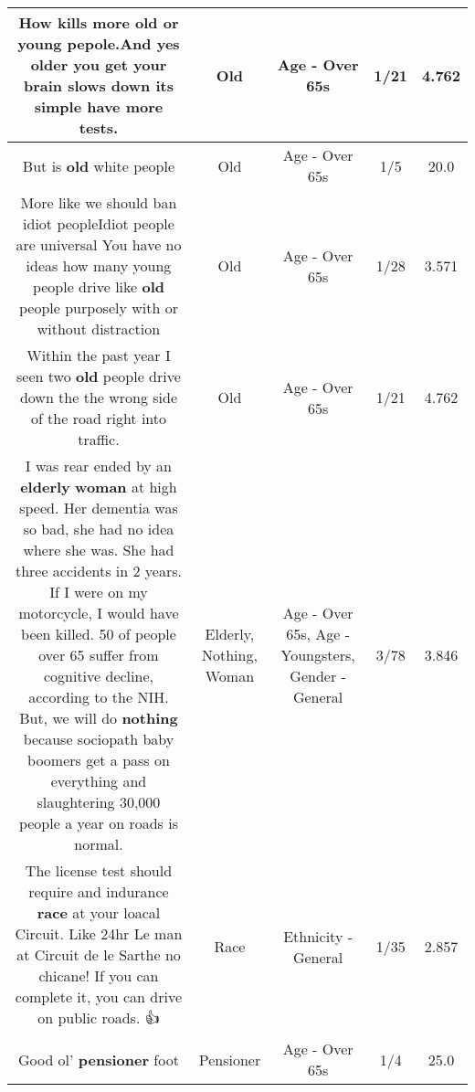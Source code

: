 \documentclass[11pt]{article}
\newlength\mylength
\begin{document}
\begin{center}
\begin{longtable}{|C{.65\mylength}|C{.30\mylength}|C{.12\mylength}|C{.12\mylength}|C{.12\mylength}|}
  \small How kills more \textbf{old} or young pepole.And yes older you get your brain slows down its simple have more tests.\normalsize   & Old & Age - Over 65s & 1/21 & 4.762 \\  \hline
  \small But is \textbf{old} white people\normalsize   & Old & Age - Over 65s & 1/5 & 20.0 \\  \hline
  \small More like we should ban idiot peopleIdiot people are universal You have no ideas how many young people drive like \textbf{old} people purposely with or without distraction\normalsize   & Old & Age - Over 65s & 1/28 & 3.571 \\  \hline
  \small Within the past year I seen two \textbf{old} people drive down the the wrong side of the road right into traffic.\normalsize   & Old & Age - Over 65s & 1/21 & 4.762 \\  \hline
  \small I was rear ended by an \textbf{elderly} \textbf{woman} at high speed. Her dementia was so bad, she had no idea where she was. She had three accidents in 2 years. If I were on my motorcycle, I would have been killed. 50 of people over 65 suffer from cognitive decline, according to the NIH. But, we will do \textbf{nothing} because sociopath baby boomers get a pass on everything and slaughtering 30,000 people a year on roads is normal.\normalsize   & Elderly, Nothing, Woman & Age - Over 65s, Age - Youngsters, Gender - General & 3/78 & 3.846 \\  \hline
  \small The license test should require and indurance \textbf{race} at your loacal Circuit. Like  24hr Le man at Circuit de le Sarthe no chicane! If you can complete it, you can drive on public roads. 👍\normalsize   & Race & Ethnicity - General & 1/35 & 2.857 \\  \hline
  \small Good ol' \textbf{pensioner} foot\normalsize   & Pensioner & Age - Over 65s & 1/4 & 25.0 \\  \hline

\end{longtable}
\end{center}
\end{document}
